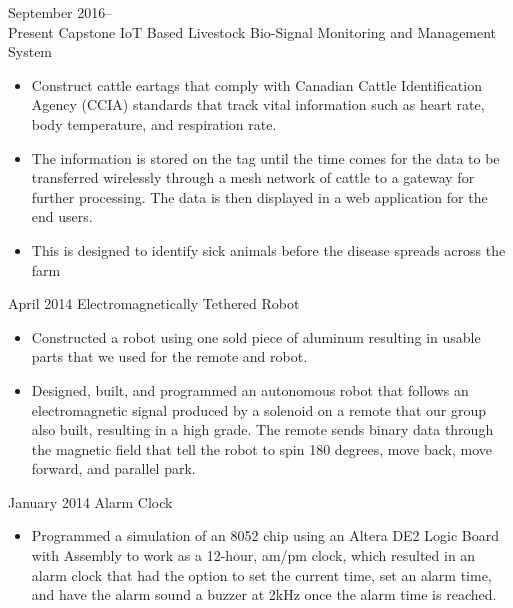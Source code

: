 \documentclass[]{friggeri-cv} %
\begin{document}
\begin{entrylist}

\entry
{September 2016--\\Present}
{Capstone {\normalfont IoT Based Livestock Bio-Signal Monitoring and Management System}}
{}
{
\begin{itemize}
\item Construct cattle eartags that comply with Canadian Cattle Identification
  Agency (CCIA) standards that track vital information such as heart rate, body
    temperature, and respiration rate.
\item The information is stored on the tag until the time comes for the
  data to be transferred wirelessly through a mesh network of cattle to a
    gateway for further processing. The data is then displayed in
    a web application for the end users.
\item This is designed to identify sick animals before the disease spreads
  across the farm
\end{itemize}
}
\entry
{April 2014}
{Electromagnetically Tethered Robot}
{}
{
\begin{itemize}
\item Constructed a robot using one sold piece of aluminum resulting in usable
parts that we used for the remote and robot.
\item Designed, built, and programmed an autonomous robot that follows an
electromagnetic signal produced by a
solenoid on a remote that our group also built, resulting in a high grade. The
remote sends binary data through
the magnetic field that tell the robot to spin 180 degrees, move back, move
forward, and parallel park.
\end{itemize}
}
\entry
{January 2014}
{Alarm Clock}
{}
{
\begin{itemize}
\item Programmed a simulation of an 8052 chip using an Altera DE2 Logic Board
with Assembly to work as a 12-hour, am/pm clock, which resulted in an alarm
clock that had the option to set the current time, set an alarm time, and have
the alarm sound a buzzer at 2kHz once the alarm time is reached.
\end{itemize}
}
\end{entrylist}
\end{document}
